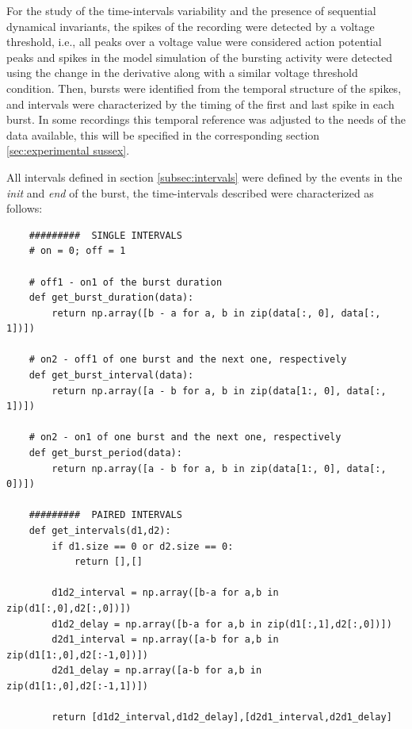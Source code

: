 For the study of the time-intervals variability and the presence of sequential dynamical invariants, the spikes of the recording were detected by a voltage threshold, i.e., all peaks over a voltage value were considered action potential peaks and spikes in the model simulation of the bursting activity were detected using the change in the derivative along with a similar voltage threshold condition. Then, bursts were identified from the temporal structure of the spikes, and intervals were characterized by the timing of the first and last spike in each burst. In some recordings this temporal reference was adjusted to the needs of the data available, this will be specified in the corresponding section \ref{sec:experimental sussex}.

All intervals defined in section \ref{subsec:intervals} were defined by the events in the \textit{init} and \textit{end} of the burst, the time-intervals described were characterized as follows:


\begin{lstlisting}
	#########  SINGLE INTERVALS
	# on = 0; off = 1
	
	# off1 - on1 of the burst duration
	def get_burst_duration(data):
		return np.array([b - a for a, b in zip(data[:, 0], data[:, 1])])
	
	# on2 - off1 of one burst and the next one, respectively
	def get_burst_interval(data):
		return np.array([a - b for a, b in zip(data[1:, 0], data[:, 1])])
		
	# on2 - on1 of one burst and the next one, respectively
	def get_burst_period(data):
		return np.array([a - b for a, b in zip(data[1:, 0], data[:, 0])])
		
	#########  PAIRED INTERVALS
	def get_intervals(d1,d2):
		if d1.size == 0 or d2.size == 0:
			return [],[]
			
		d1d2_interval = np.array([b-a for a,b in zip(d1[:,0],d2[:,0])])
		d1d2_delay = np.array([b-a for a,b in zip(d1[:,1],d2[:,0])])
		d2d1_interval = np.array([a-b for a,b in zip(d1[1:,0],d2[:-1,0])])
		d2d1_delay = np.array([a-b for a,b in zip(d1[1:,0],d2[:-1,1])])
	
		return [d1d2_interval,d1d2_delay],[d2d1_interval,d2d1_delay]
\end{lstlisting}

